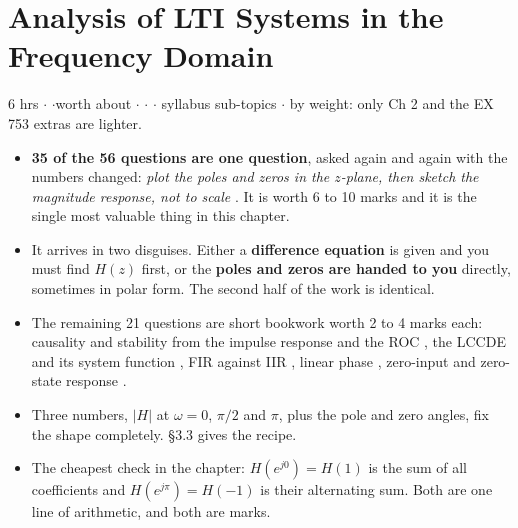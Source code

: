 \section{Analysis of LTI Systems in the Frequency Domain}

{\color{sub}\footnotesize 6 hrs \gap$\cdot$\gap {}
\gap$\cdot$\gap worth about  \gap$\cdot$\gap {} \gap$\cdot$\gap {} \gap$\cdot$ syllabus sub-topics
\gap$\cdot$\gap {} by weight: only Ch 2 and the EX 753 extras
are lighter.}

\begin{itemize}
  \item \textbf{35 of the 56 questions are one question}, asked again and again with the
        numbers changed: \emph{plot the poles and zeros in the $z$-plane, then sketch the
        magnitude response, not to scale} . It is worth 6 to 10 marks and it is
        the single most valuable thing in this chapter.
  \item It arrives in two disguises. Either a \textbf{difference equation} is given and
        you must find $H(z)$ first, or the \textbf{poles and zeros are handed to you}
        directly, sometimes in polar form. The second half of the work is identical.
  \item The remaining 21 questions are short bookwork worth 2 to 4 marks each:
        causality and stability from the impulse response and the ROC , the LCCDE
        and its system function , FIR against IIR , linear phase ,
        zero-input and zero-state response .
  \item {} Three numbers, $|H|$ at $\omega=0$,
        $\pi/2$ and $\pi$, plus the pole and zero angles, fix the shape completely.
        \S3.3 gives the recipe.
  \item The cheapest check in the chapter: $H(e^{j0})=H(1)$ is the sum of all
        coefficients and $H(e^{j\pi})=H(-1)$ is their alternating sum. Both are one
        line of arithmetic, and both are marks.
\end{itemize}


